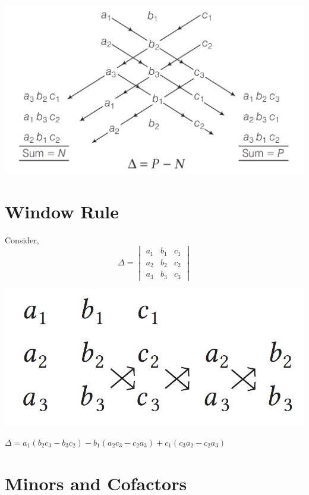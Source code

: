 \documentclass{article}
\begin{document}
\begin{center}
    \includegraphics[scale=0.3]{img_1.png}
\end{center}
\section{Window Rule}
Consider, $$\Delta = \begin{vmatrix}
    a_{1} &b_{1} &c_{1} \\
     a_{2} &b_{2} &c_{2} \\
     a_{3} &b_{3} &c_{3}  
\end{vmatrix}$$

\begin{center}
    \includegraphics[scale=0.2]{img_2.png}
\end{center}
$\Delta = a_{1}\left(b_{2}c_{3} - b_{3}c_{2} \right)-b_{1}\left(a_{2}c_{3}-c_{2}a_{3} \right)+c_{1}\left(c_{3}a_{2}-c_{2}a_{3} \right)$

\section{Minors and Cofactors}
\end{document}
